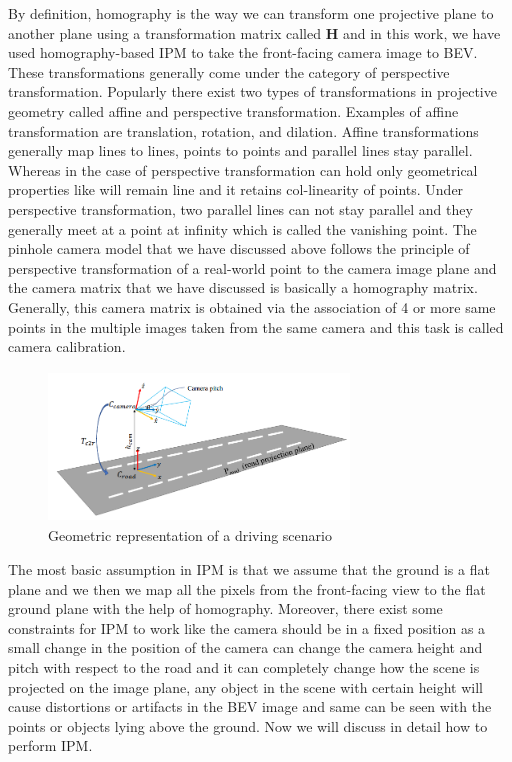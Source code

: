     By definition, homography is the way we can transform one projective plane to another plane using a transformation matrix called \textbf{H} and in this work, we have used homography-based IPM to take the front-facing camera image to BEV. These transformations generally come under the category of perspective transformation. Popularly there exist two types of transformations in projective geometry called affine and perspective transformation. Examples of affine transformation are translation, rotation, and dilation. Affine transformations generally map lines to lines, points to points and parallel lines stay parallel. Whereas in the case of perspective transformation can hold only geometrical properties like will remain line and it retains col-linearity of points. Under perspective transformation, two parallel lines can not stay parallel and they generally meet at a point at infinity which is called the vanishing point. The pinhole camera model that we have discussed above follows the principle of perspective transformation of a real-world point to the camera image plane and the camera matrix that we have discussed is basically a homography matrix. Generally, this camera matrix is obtained via the association of 4 or more same points in the multiple images taken from the same camera and this task is called camera calibration. 
     
            \begin{figure}[h]
    \centering
    \includegraphics[width=8cm, height =4cm]{images/camera_geometry_lane_detection.png}
    \caption{ Geometric representation of a driving scenario \cite{DBLP:journals/corr/abs-1811-10203}}
    \end{figure}
    
     The most basic assumption in IPM is that we assume that the ground is a flat plane and we then we map all the pixels from the front-facing view to the flat ground plane with the help of homography. Moreover, there exist some constraints for IPM to work like the camera should be in a fixed position as a small change in the position of the camera can change the camera height and pitch with respect to the road and it can completely change how the scene is projected on the image plane, any object in the scene with certain height will cause distortions or artifacts in the BEV image and same can be seen with the points or objects lying above the ground. Now we will discuss in detail how to perform IPM. 
     
